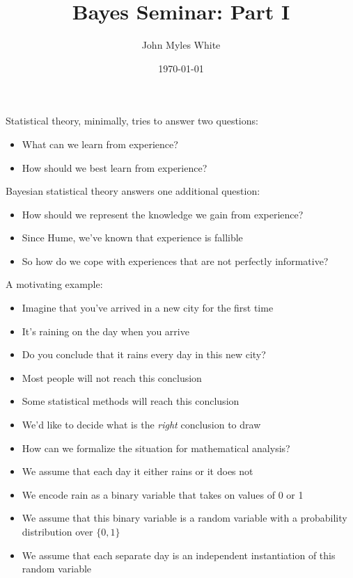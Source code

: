 \documentclass{beamer}
\title{Bayes Seminar: Part I}
\author{John Myles White}
\date{\today}
\begin{document}
\frame{\titlepage}

\frame
{
  Statistical theory, minimally, tries to answer two questions:
  \begin{itemize}
    \item{What can we learn from experience?}
    \item{How should we best learn from experience?}
  \end{itemize}
}

\frame
{
  Bayesian statistical theory answers one additional question:
  \begin{itemize}
    \item{How should we represent the knowledge we gain from experience?}
  \end{itemize}
}

\frame
{
  \begin{itemize}
    \item{Since Hume, we've known that experience is fallible}
    \item{So how do we cope with experiences that are not perfectly informative?}
  \end{itemize}
}

\frame
{
  A motivating example:
  \begin{itemize}
    \item{Imagine that you've arrived in a new city for the first time}
    \item{It's raining on the day when you arrive}
    \item{Do you conclude that it rains every day in this new city?}
  \end{itemize}
}

\frame
{
  \begin{itemize}
    \item{Most people will not reach this conclusion}
    \item{Some statistical methods will reach this conclusion}
    \item{We'd like to decide what is the \emph{right} conclusion to draw}
    \item{How can we formalize the situation for mathematical analysis?}
  \end{itemize}
}

\frame
{
  \begin{itemize}
    \item<1->{We assume that each day it either rains or it does not}
    \item<2->{We encode rain as a binary variable that takes on values of 0 or 1}
    \item<3->{We assume that this binary variable is a random variable with a probability distribution over $\{0, 1\}$}
    \item<4->{We assume that each separate day is an independent instantiation of this random variable}
  \end{itemize}
}
\end{document}
